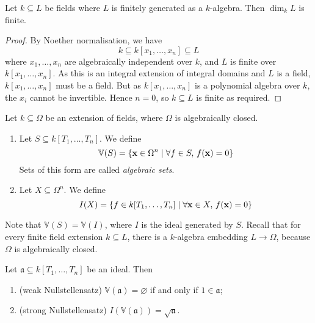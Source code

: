 \begin{proposition}
    Let \( k \subseteq L \) be fields where \( L \) is finitely generated as a \( k \)-algebra.
    Then \( \dim_k L \) is finite.
\end{proposition}
\begin{proof}
    By Noether normalisation, we have
    \[ k \subseteq k[x_1, \dots, x_n] \subseteq L \]
    where \( x_1, \dots, x_n \) are algebraically independent over \( k \), and \( L \) is finite over \( k[x_1, \dots, x_n] \).
    As this is an integral extension of integral domains and \( L \) is a field, \( k[x_1, \dots, x_n] \) must be a field.
    But as \( k[x_1, \dots, x_n] \) is a polynomial algebra over \( k \), the \( x_i \) cannot be invertible.
    Hence \( n = 0 \), so \( k \subseteq L \) is finite as required.
\end{proof}
\begin{definition}
    Let \( k \subseteq \Omega \) be an extension of fields, where \( \Omega \) is algebraically closed.
    \begin{enumerate}
        \item Let \( S \subseteq k[T_1, \dots, T_n] \).
        We define
        \[ \mathbb V(S) = \qty{\vb x \in \Omega^n \mid \forall f \in S,\, f(\vb x) = 0} \]
        Sets of this form are called \emph{algebraic sets}.
        \item Let \( X \subseteq \Omega^n \).
        We define
        \[ I(X) = \qty{f \in k[T_1, \dots, T_n] \mid \forall \vb x \in X,\, f(\vb x) = 0} \]
    \end{enumerate}
\end{definition}
Note that \( \mathbb V(S) = \mathbb V(I) \), where \( I \) is the ideal generated by \( S \).
Recall that for every finite field extension \( k \subseteq L \), there is a \( k \)-algebra embedding \( L \to \Omega \), because \( \Omega \) is algebraically closed.
\begin{theorem}
    Let \( \mathfrak a \subseteq k[T_1, \dots, T_n] \) be an ideal.
    Then
    \begin{enumerate}
        \item (weak Nullstellensatz) \( \mathbb V(\mathfrak a) = \varnothing \) if and only if \( 1 \in \mathfrak a \);
        \item (strong Nullstellensatz) \( I(\mathbb V(\mathfrak a)) = \sqrt{\mathfrak a} \).
    \end{enumerate}
\end{theorem}
